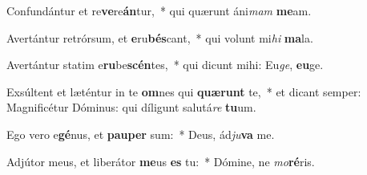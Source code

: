\item Confundántur et re\textbf{ve}re\textbf{án}tur,~* qui quærunt áni\textit{mam} \textbf{me}am.
\item Avertántur retrórsum, et \textbf{e}ru\textbf{bés}cant,~* qui volunt mi\textit{hi} \textbf{ma}la.
\item Avertántur statim e\textbf{ru}be\textbf{scén}tes,~* qui dicunt mihi: Eu\textit{ge}, \textbf{eu}ge.
\item Exsúltent et læténtur in te \textbf{om}nes qui \textbf{quæ}\textbf{runt} te,~* et dicant semper: Magnificétur Dóminus: qui díligunt salutá\textit{re} \textbf{tu}um.
\item Ego vero e\textbf{gé}nus, et \textbf{pau}\textbf{per} sum:~* Deus, ád\textit{ju}\textbf{va} me.
\item Adjútor meus, et liberátor \textbf{me}us \textbf{es} tu:~* Dómine, ne \textit{mo}\textbf{ré}ris.
